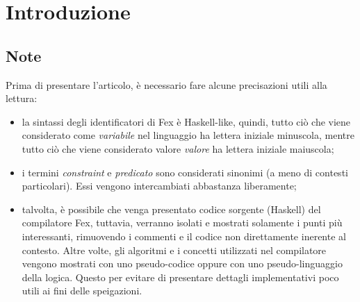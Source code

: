 \documentclass[10pt,a4paper]{article}
\begin{document}
\textwidth=450pt\oddsidemargin=0pt

\tableofcontents
\newpage

\section{Introduzione}

\subsection{Note}
Prima di presentare l'articolo, è necessario fare alcune precisazioni utili alla lettura:
\begin{itemize}
    \item la sintassi degli identificatori di Fex è Haskell-like, quindi, tutto ciò che viene considerato come
    \textit{variabile} nel linguaggio ha lettera iniziale minuscola, mentre tutto ciò che viene considerato valore
    \textit{valore} ha lettera iniziale maiuscola;
    \item i termini \textit{constraint} e \textit{predicato} sono considerati sinonimi (a meno di contesti particolari).
    Essi vengono intercambiati abbastanza liberamente;
    \item talvolta, è possibile che venga presentato codice sorgente (Haskell) del compilatore Fex, tuttavia, verranno
    isolati e mostrati solamente i punti più interessanti, rimuovendo i commenti e il codice non direttamente inerente
    al contesto. Altre volte, gli algoritmi e i concetti utilizzati nel compilatore vengono mostrati con uno
    pseudo-codice oppure con uno pseudo-linguaggio della logica. Questo per evitare di presentare dettagli implementativi
    poco utili ai fini delle speigazioni.
\end{itemize}
\end{document}
